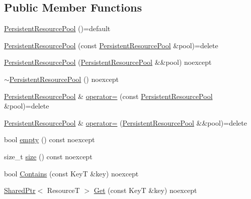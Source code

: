 \subsection*{Public Member Functions}
\begin{DoxyCompactItemize}
\item 
\mbox{\hyperlink{classmage_1_1_persistent_resource_pool_a23b83adf594628b93c368a2da7660ef8}{Persistent\+Resource\+Pool}} ()=default
\item 
\mbox{\hyperlink{classmage_1_1_persistent_resource_pool_af49749cabca4e6e16b2c073f6f550e0b}{Persistent\+Resource\+Pool}} (const \mbox{\hyperlink{classmage_1_1_persistent_resource_pool}{Persistent\+Resource\+Pool}} \&pool)=delete
\item 
\mbox{\hyperlink{classmage_1_1_persistent_resource_pool_acf26c05e2e6031720fa92fb0cec0d398}{Persistent\+Resource\+Pool}} (\mbox{\hyperlink{classmage_1_1_persistent_resource_pool}{Persistent\+Resource\+Pool}} \&\&pool) noexcept
\item 
\mbox{\hyperlink{classmage_1_1_persistent_resource_pool_a13bb68c8a9f8c37f9f217aea2625935a}{$\sim$\+Persistent\+Resource\+Pool}} () noexcept
\item 
\mbox{\hyperlink{classmage_1_1_persistent_resource_pool}{Persistent\+Resource\+Pool}} \& \mbox{\hyperlink{classmage_1_1_persistent_resource_pool_a796e9dbb12e2756412c50117a6a67f86}{operator=}} (const \mbox{\hyperlink{classmage_1_1_persistent_resource_pool}{Persistent\+Resource\+Pool}} \&pool)=delete
\item 
\mbox{\hyperlink{classmage_1_1_persistent_resource_pool}{Persistent\+Resource\+Pool}} \& \mbox{\hyperlink{classmage_1_1_persistent_resource_pool_adcec8a286b15174ee99200b68ba0589e}{operator=}} (\mbox{\hyperlink{classmage_1_1_persistent_resource_pool}{Persistent\+Resource\+Pool}} \&\&pool)=delete
\item 
bool \mbox{\hyperlink{classmage_1_1_persistent_resource_pool_a9a5669551c15823b817b3c4716a5a52c}{empty}} () const noexcept
\item 
size\+\_\+t \mbox{\hyperlink{classmage_1_1_persistent_resource_pool_a97dee6f5087b59f3e5b4fe14dca74b40}{size}} () const noexcept
\item 
bool \mbox{\hyperlink{classmage_1_1_persistent_resource_pool_a92af0c4a200ea217b831d89cfc321557}{Contains}} (const KeyT \&key) noexcept
\item 
\mbox{\hyperlink{namespacemage_a1e01ae66713838a7a67d30e44c67703e}{Shared\+Ptr}}$<$ ResourceT $>$ \mbox{\hyperlink{classmage_1_1_persistent_resource_pool_ad8d5e096f7f9f0446993b83fe1767fd3}{Get}} (const KeyT \&key) noexcept

\end{DoxyCompactItemize}
